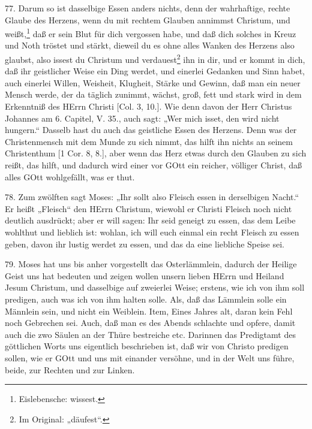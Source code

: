 77. Darum so ist dasselbige Essen anders nichts, denn der wahrhaftige, rechte Glaube des Herzens, wenn du mit rechtem Glauben annimmst Christum, und weißt,\footnote{Eislebensche: wissest.} daß er sein Blut für dich vergossen habe, und daß dich solches in Kreuz und Noth tröstet und stärkt, dieweil du es ohne alles Wanken des Herzens also glaubst, also issest du Christum und verdauest\footnote{Im Original: „däufest“.} ihn in dir, und er kommt in dich, daß ihr geistlicher Weise ein Ding werdet, und einerlei Gedanken und Sinn habet, auch einerlei Willen, Weisheit, Klugheit, Stärke und Gewinn, daß man ein neuer Mensch werde, der da täglich zunimmt, wächst, groß, fett und stark wird in dem Erkenntniß des HErrn Christi [Col. 3, 10.]. Wie denn davon der Herr Christus Johannes am 6. Capitel, V. 35., auch sagt: „Wer mich isset, den wird nicht hungern.“ Dasselb hast du auch das geistliche Essen des Herzens. Denn was der Christenmensch mit dem Munde zu sich nimmt, das hilft ihn nichts an seinem Christenthum [1 Cor. 8, 8.], aber wenn das Herz etwas durch den Glauben zu sich reißt, das hilft, und dadurch
wird einer vor GOtt ein reicher, völliger Christ, daß alles GOtt wohlgefällt, was er thut.

78. Zum zwölften sagt Moses: „Ihr sollt also Fleisch essen in derselbigen Nacht.“ Er heißt „Fleisch“ den HErrn Christum, wiewohl er Christi Fleisch noch nicht deutlich ausdrückt; aber er will sagen: Ihr seid geneigt zu essen, das dem Leibe wohlthut und lieblich ist: wohlan, ich will euch einmal ein recht Fleisch zu essen geben, davon ihr lustig werdet zu essen, und das da eine liebliche Speise sei.

79. Moses hat uns bis anher vorgestellt das Osterlämmlein, dadurch der Heilige Geist uns hat bedeuten und zeigen wollen unsern lieben HErrn und Heiland Jesum Christum, und dasselbige auf zweierlei Weise; erstens, wie ich von ihm soll predigen, auch was ich von ihm halten solle. Als, daß das Lämmlein solle ein Männlein sein, und nicht ein Weiblein. Item, Eines Jahres alt, daran kein Fehl noch Gebrechen sei. Auch, daß man es des Abends schlachte und opfere, damit auch die zwo Säulen an der Thüre bestreiche etc. Darinnen das Predigtamt des göttlichen Worts uns eigentlich beschrieben ist, daß wir von Christo predigen sollen, wie er GOtt und uns mit einander versöhne, und in der Welt uns führe, beide, zur Rechten und zur Linken.

